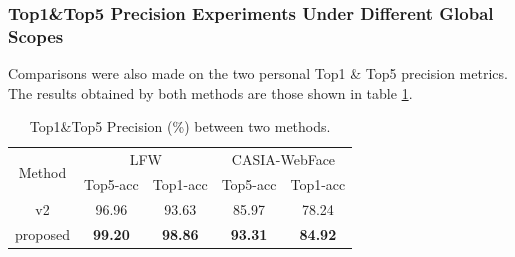 \subsubsection{Top1\&Top5 Precision Experiments Under Different Global Scopes}
Comparisons were also made on the two personal Top1 \& Top5 precision 
metrics. The results obtained by both methods are those shown in table \ref{T12}.
\begin{table}[h!]
    \centering
    \begin{adjustbox}{max width=\textwidth}
    \begin{tabular}{|c|cc|cc|}
        \hline
        \multirow{2}{*}{Method} & \multicolumn{2}{c|}{LFW} & \multicolumn{2}{c|}{CASIA-WebFace}\\
        & Top5-acc & Top1-acc & Top5-acc & Top1-acc\\
        \hline
        v2 & 96.96 & 93.63 & 85.97 & 78.24\\
        \hline
        proposed & \bfseries{99.20} & \bfseries{98.86} & \bfseries{93.31} & \bfseries{84.92}\\
        \hline    
    \end{tabular}
    \end{adjustbox}
    \caption{Top1\&Top5 Precision (\%) between two methods.}
    \label{T12}
\end{table}

